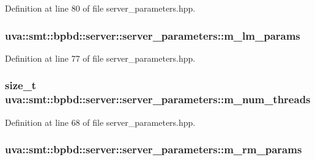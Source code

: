 Definition at line 80 of file server\+\_\+parameters.\+hpp.

\hypertarget{structuva_1_1smt_1_1bpbd_1_1server_1_1server__parameters_a572abdaf3ed224f54264606d7a15e872}{}
\subsubsection[{m\+\_\+lm\+\_\+params}]{ uva\+::smt\+::bpbd\+::server\+::server\+\_\+parameters\+::m\+\_\+lm\+\_\+params}\label{structuva_1_1smt_1_1bpbd_1_1server_1_1server__parameters_a572abdaf3ed224f54264606d7a15e872}


Definition at line 77 of file server\+\_\+parameters.\+hpp.

\hypertarget{structuva_1_1smt_1_1bpbd_1_1server_1_1server__parameters_a820bb1be7c6ad4b8b3f618bec32d1e27}{}
\subsubsection[{m\+\_\+num\+\_\+threads}]{\setlength{\rightskip}{0pt plus 5cm}size\+\_\+t uva\+::smt\+::bpbd\+::server\+::server\+\_\+parameters\+::m\+\_\+num\+\_\+threads}\label{structuva_1_1smt_1_1bpbd_1_1server_1_1server__parameters_a820bb1be7c6ad4b8b3f618bec32d1e27}


Definition at line 68 of file server\+\_\+parameters.\+hpp.

\hypertarget{structuva_1_1smt_1_1bpbd_1_1server_1_1server__parameters_a44c85db327e8e94de77ed7de2dcc9765}{}
\subsubsection[{m\+\_\+rm\+\_\+params}]{ uva\+::smt\+::bpbd\+::server\+::server\+\_\+parameters\+::m\+\_\+rm\+\_\+params}\label{structuva_1_1smt_1_1bpbd_1_1server_1_1server__parameters_a44c85db327e8e94de77ed7de2dcc9765}


